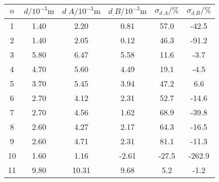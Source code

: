 \label{tab:tabAScan2MHzFehler}
	\begin{tabular}{S[table-format=1.0]S[table-format=2.2]S[table-format=2.2]S[table-format=1.2]S[table-format=2.1]S[table-format=3.1]}
		\toprule
		{$n$} & {$d/10^{-3}\si{\metre}$} & {$d_.{A}/10^{-3}\si{\metre}$} & {$d_.{B}/10^{-3}\si{\metre}$} & {$\sigma_{d_.{A}}/\%$} & {$\sigma_{d_.{B}}/\%$} \\
		 & 1.40 & 2.20 & 0.81 & 57.0 & -42.5 \\
		2 & 1.40 & 2.05 & 0.12 & 46.3 & -91.2 \\
		3 & 5.80 & 6.47 & 5.58 & 11.6 & -3.7 \\
		4 & 4.70 & 5.60 & 4.49 & 19.1 & -4.5 \\
		5 & 3.70 & 5.45 & 3.94 & 47.2 & 6.6 \\
		6 & 2.70 & 4.12 & 2.31 & 52.7 & -14.6 \\
		7 & 2.70 & 4.56 & 1.62 & 68.9 & -39.8 \\
		8 & 2.60 & 4.27 & 2.17 & 64.3 & -16.5 \\
		9 & 2.60 & 4.71 & 2.31 & 81.1 & -11.3 \\
		10 & 1.60 & 1.16 & -2.61 & -27.5 & -262.9 \\
		11 & 9.80 & 10.31 & 9.68 & 5.2 & -1.2 \\
		\bottomrule
	\end{tabular}
